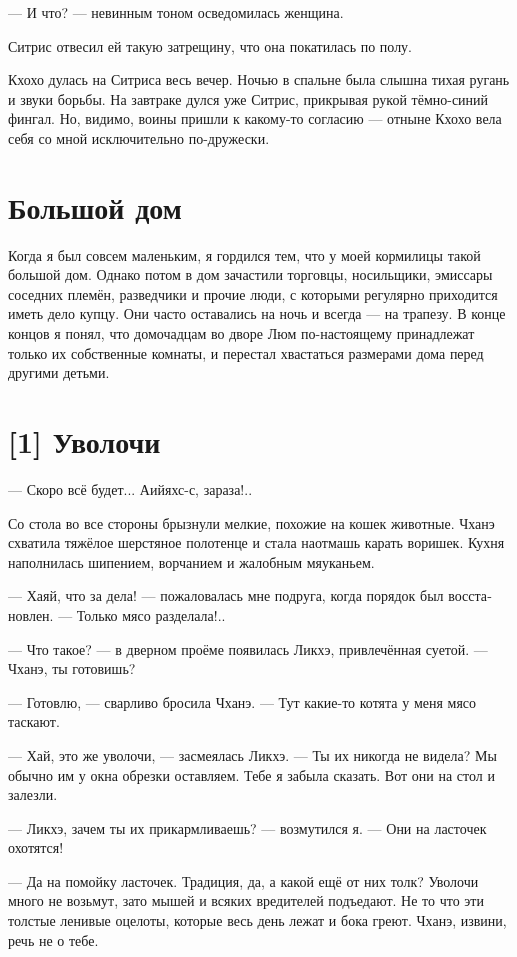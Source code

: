 \documentclass[a4paper,12pt,fleqn]{book}\usepackage{cooltooltips}\usepackage{polyglossia}\setdefaultlanguage[babelshorthands=true]{russian}\setotherlanguage{english}\defaultfontfeatures{Ligatures=TeX,Mapping=tex-text} \usepackage{xcolor}\definecolor{lightgray}{HTML}{bbbbbb}\color{lightgray}\newcommand{\ml}[3]{\textenglish{\textcolor{black}{#3}}}
\begin{document}
{--- И что? --- невинным тоном осведомилась женщина.

Ситрис отвесил ей такую затрещину, что она покатилась по полу.

Кхохо дулась на Ситриса весь вечер.
Ночью в спальне была слышна тихая ругань и звуки борьбы.
На завтраке дулся уже Ситрис, прикрывая рукой тёмно-синий фингал.
Но, видимо, воины пришли к какому-то согласию --- отныне Кхохо вела себя со мной исключительно по-дружески.

\section{Большой дом}

Когда я был совсем маленьким, я гордился тем, что у моей кормилицы такой большой дом.
Однако потом в дом зачастили торговцы, носильщики, эмиссары соседних племён, разведчики и прочие люди, с которыми регулярно приходится иметь дело купцу.
Они часто оставались на ночь и всегда --- на трапезу.
В конце концов я понял, что домочадцам во дворе Люм по-настоящему принадлежат только их собственные комнаты, и перестал хвастаться размерами дома перед другими детьми.

\section{[1] Уволочи}

--- Скоро всё будет...
Аийяхс-с, зараза!..

Со стола во все стороны брызнули мелкие, похожие на кошек животные.
Чханэ схватила тяжёлое шерстяное полотенце и стала наотмашь карать воришек.
Кухня наполнилась шипением, ворчанием и жалобным мяуканьем.

--- Хаяй, что за дела! --- пожаловалась мне подруга, когда порядок был восстановлен.
--- Только мясо разделала!..

--- Что такое? --- в дверном проёме появилась Ликхэ, привлечённая суетой.
--- Чханэ, ты готовишь?

--- Готовлю, --- сварливо бросила Чханэ.
--- Тут какие-то котята у меня мясо таскают.

--- Хай, это же уволочи, --- засмеялась Ликхэ.
--- Ты их никогда не видела?
Мы обычно им у окна обрезки оставляем.
Тебе я забыла сказать.
Вот они на стол и залезли.

--- Ликхэ, зачем ты их прикармливаешь? --- возмутился я.
--- Они на ласточек охотятся!

--- Да на помойку ласточек.
Традиция, да, а какой ещё от них толк?
Уволочи много не возьмут, зато мышей и всяких вредителей подъедают.
Не то что эти толстые ленивые оцелоты, которые весь день лежат и бока греют.
Чханэ, извини, речь не о тебе.

}
\end{document}
